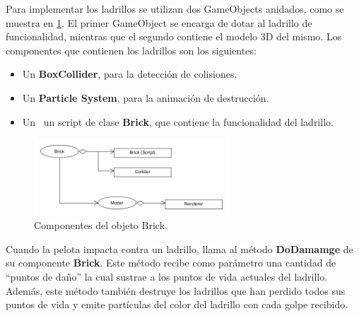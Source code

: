 Para implementar los ladrillos se utilizan dos GameObjects anidados, como se muestra en \ref{diagrama_brick}. El primer GameObject se encarga de dotar al ladrillo de funcionalidad, mientras que el segundo contiene el modelo 3D del mismo. Los componentes que contienen los ladrillos son los siguientes: 
\begin{itemize}
\item Un \textbf{BoxCollider}, para la detección de colisiones.
\item Un \textbf{Particle System}, para la animación de destrucción.
\item Un \ un script de clase \textbf{Brick}, que contiene la funcionalidad del ladrillo.
\end{itemize}
\begin{figure}[h]
	\includegraphics[width=0.65\textwidth]{images/estructura/fisica/bricks}
	\centering
	\caption{Componentes del objeto Brick.}
	\label{diagrama_brick}
\end{figure}

Cuando la pelota impacta contra un ladrillo, llama al método \textbf{DoDamamge} de su componente \textbf{Brick}. Este método recibe como parámetro una cantidad de ``puntos de daño'' la cual sustrae a los puntos de vida actuales del ladrillo. Además, este método también destruye los ladrillos que han perdido todos sus puntos de vida y emite partículas del color del ladrillo con cada golpe recibido. 

